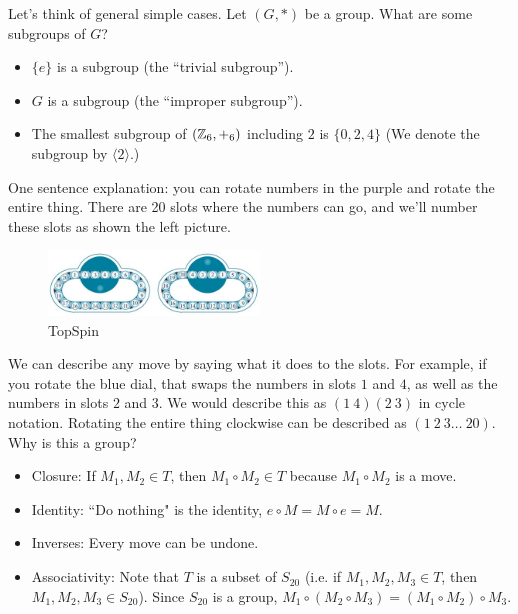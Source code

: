 Let's think of general simple cases. Let $(G, *)$ be a group. What are some subgroups of $G$?
\begin{itemize}
    \item $\{e\}$ is a subgroup (the ``trivial subgroup'').
    \item $G$ is a subgroup (the ``improper subgroup'').
\end{itemize}

\begin{example}[Subgroups of $(\Z_6, +)$]
\quad
\begin{itemize}
    \item The smallest subgroup of $(\mathbb{Z}_6, +_6)$ including $2$ is $\{0, 2, 4\}$ (We denote the subgroup by $\langle 2 \rangle$.) 
\end{itemize}
\end{example}

\begin{example}[TopSpin!]
One sentence explanation: you can rotate numbers in the purple and rotate the entire thing. There are 20 slots where the numbers can go, and we'll number these slots as shown the left picture.

\begin{figure}[h]
    \centering
    \includegraphics[width=0.5\textwidth]{notes/images/topspin.jpg}
    \caption{TopSpin}
    \label{fig:topspin}
\end{figure}

We can describe any move by saying what it does to the slots. For example, if you rotate the blue dial, that swaps the numbers in slots $1$ and $4$, as well as the numbers in slots $2$ and $3$. We would describe this as $(1 \ 4)(2 \ 3)$ in cycle notation. Rotating the entire thing clockwise can be described as $(1 \ 2 \ 3 \dots \ 20)$. Why is this a group?

\begin{itemize}
    \item Closure: If $M_1, M_2 \in T$, then $M_1 \circ M_2 \in T$ because $M_1 \circ M_2$ is a move.
    \item Identity: ``Do nothing" is the identity, $e \circ M = M \circ e = M$.
    \item Inverses: Every move can be undone.
    \item Associativity: Note that $T$ is a subset of $S_{20}$ (i.e. if $M_1, M_2, M_3 \in T$, then $M_1, M_2, M_3 \in S_{20}$). Since $S_{20}$ is a group, $M_1 \circ (M_2 \circ M_3) = (M_1 \circ M_2) \circ M_3$.
\end{itemize}

\end{example}

